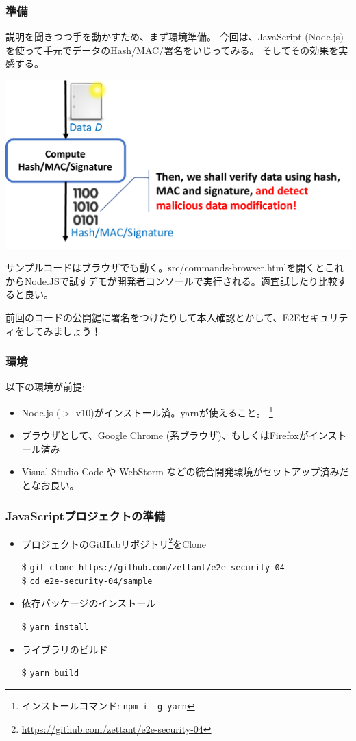 \documentclass[12pt,dvipdfmx]{beamer}
\begin{document}
\begin{frame}
\frametitle{準備}
\small
説明を聞きつつ手を動かすため、まず環境準備。
\alert{今回は、JavaScript (Node.js) を使って手元でデータのHash/MAC/署名をいじってみる。}
そしてその効果を実感する。

\begin{center}
\includegraphics[width=0.7\linewidth]{Figs/md-flow.pdf}
\end{center}

\alert{サンプルコードはブラウザでも動く}。src/commands-browser.htmlを開くとこれからNode.JSで試すデモが開発者コンソールで実行される。適宜試したり比較すると良い。
\end{frame}

\begin{frame}
前回のコードの公開鍵に署名をつけたりして本人確認とかして、E2Eセキュリティをしてみましょう！
\end{frame}

\begin{frame}
\frametitle{環境}
以下の環境が前提:
\begin{itemize}
 \item Node.js ($>$ v10)がインストール済。yarnが使えること。 \footnote[frame]{インストールコマンド: \texttt{npm i -g yarn}}
 \item ブラウザとして、Google Chrome (系ブラウザ)、もしくはFirefoxがインストール済み
 \item Visual Studio Code や WebStorm などの統合開発環境がセットアップ済みだとなお良い。
\end{itemize}
\end{frame}

\begin{frame}
\frametitle{JavaScriptプロジェクトの準備}
\begin{itemize}
\item プロジェクトのGitHubリポジトリ\footnote[frame]{\url{https://github.com/zettant/e2e-security-04}}をClone\\
\begin{exampleblock}{}
\footnotesize
\$ \texttt{git clone https://github.com/zettant/e2e-security-04}\\
\$ \texttt{cd e2e-security-04/sample}
\end{exampleblock}
\item 依存パッケージのインストール
\begin{exampleblock}{}
\$ \texttt{yarn install}
\end{exampleblock}
\item ライブラリのビルド
\begin{exampleblock}{}
\$ \texttt{yarn build}
\end{exampleblock}
\end{itemize}
\end{frame}
\end{document}
